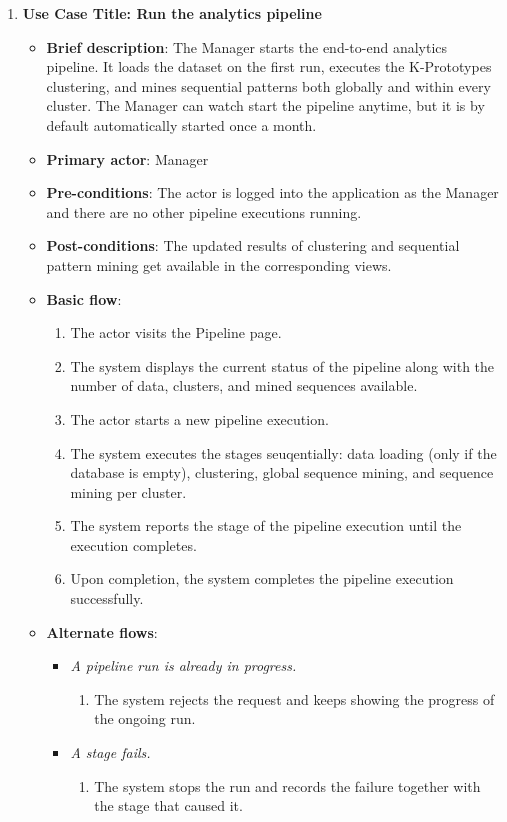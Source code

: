 \begin{enumerate}
\item \textbf{Use Case Title: Run the analytics pipeline}
\begin{itemize}
    \item \textbf{Brief description}: The Manager starts the end-to-end analytics pipeline. It loads the dataset on the first run, executes the K-Prototypes clustering, and mines sequential patterns both globally and within every cluster. The Manager can watch start the pipeline anytime, but it is by default automatically started once a month.
    \item \textbf{Primary actor}: Manager
    \item \textbf{Pre-conditions}: The actor is logged into the application as the Manager and there are no other pipeline executions running.
    \item \textbf{Post-conditions}: The updated results of clustering and sequential pattern mining get available in the corresponding views.
    \item \textbf{Basic flow}:
    \begin{enumerate}
        \item The actor visits the Pipeline page.
        \item The system displays the current status of the pipeline along with the number of data, clusters, and mined sequences available.
        \item The actor starts a new pipeline execution.
        \item The system executes the stages seuqentially: data loading (only if the database is empty), clustering, global sequence mining, and sequence mining per cluster.
        \item The system reports the stage of the pipeline execution until the execution completes.
        \item Upon completion, the system completes the pipeline execution successfully.
    \end{enumerate}
    \item \textbf{Alternate flows}:
    \begin{itemize}
        \item[3a.] \textit{A pipeline run is already in progress.}
        \begin{enumerate}
            \item The system rejects the request and keeps showing the progress of the ongoing run.
        \end{enumerate}
        \item[4a.] \textit{A stage fails.}
        \begin{enumerate}
            \item The system stops the run and records the failure together with the stage that caused it.
        \end{enumerate}
    \end{itemize}
\end{itemize}


\end{enumerate}
